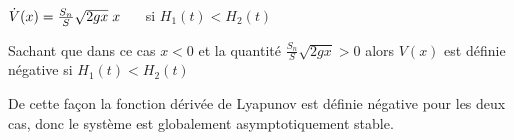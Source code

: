 	\begin{center}
	
		$ \dot{V} (x) = \frac{S_n}{S} \sqrt{2gx}\hspace{1mm} x \hspace{0.5 cm}$ si $H_1(t) < H_2(t) $
			
	\end{center}
	
	\par Sachant que dans ce cas $x<0$ et la quantité $\frac{S_n}{S} \sqrt{2gx}>0$ alors $V(x)$ est définie négative si $H_1(t) < H_2(t)$
	\par De cette façon la fonction dérivée de Lyapunov est définie négative pour les deux cas, donc le système est globalement asymptotiquement stable. 
	 